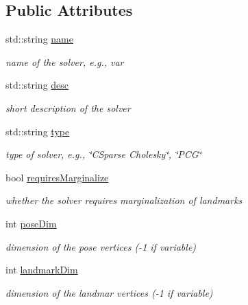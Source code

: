 \subsection*{Public Attributes}
\begin{DoxyCompactItemize}
\item 
std\+::string \mbox{\hyperlink{structg2o_1_1_optimization_algorithm_property_aedb3c54122d6a75d49e1677e836bac22}{name}}
\begin{DoxyCompactList}\small\item\em name of the solver, e.\+g., var \end{DoxyCompactList}\item 
std\+::string \mbox{\hyperlink{structg2o_1_1_optimization_algorithm_property_a9390204f7ff2f092241f55656d8458b1}{desc}}
\begin{DoxyCompactList}\small\item\em short description of the solver \end{DoxyCompactList}\item 
std\+::string \mbox{\hyperlink{structg2o_1_1_optimization_algorithm_property_a199f33f536f48f6ceda037f6a2ff206d}{type}}
\begin{DoxyCompactList}\small\item\em type of solver, e.\+g., \char`\"{}\+C\+Sparse Cholesky\char`\"{}, \char`\"{}\+P\+C\+G\char`\"{} \end{DoxyCompactList}\item 
bool \mbox{\hyperlink{structg2o_1_1_optimization_algorithm_property_a179837f3866e8786ce3a7f7a34bdda44}{requires\+Marginalize}}
\begin{DoxyCompactList}\small\item\em whether the solver requires marginalization of landmarks \end{DoxyCompactList}\item 
int \mbox{\hyperlink{structg2o_1_1_optimization_algorithm_property_a2c0c87eeaa423e8c944cfa846eb6a553}{pose\+Dim}}
\begin{DoxyCompactList}\small\item\em dimension of the pose vertices (-\/1 if variable) \end{DoxyCompactList}\item 
int \mbox{\hyperlink{structg2o_1_1_optimization_algorithm_property_ad946dec26df70a6fb6d99f2ab76db269}{landmark\+Dim}}
\begin{DoxyCompactList}\small\item\em dimension of the landmar vertices (-\/1 if variable) \end{DoxyCompactList}\end{DoxyCompactItemize}


